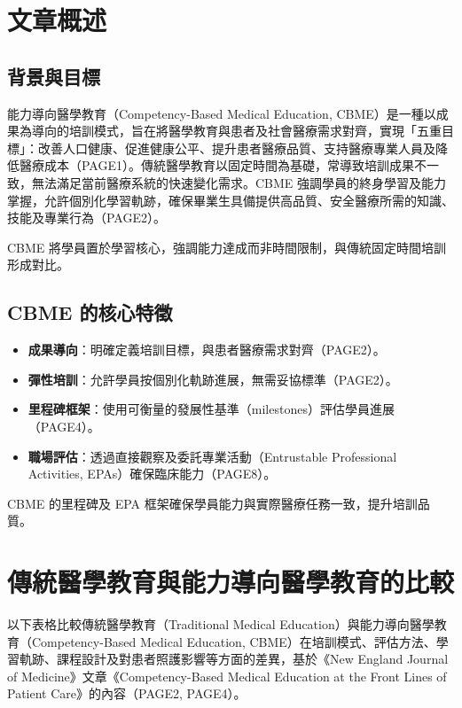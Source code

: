 \documentclass[12pt,a4paper]{article}
\newcommand{\note}[1]{
    \par
    \noindent
    \begin{tcolorbox}[
        colback=emergency_blue!5!white,
        colframe=emergency_blue,
        title=\textbf{重點提醒},
        fonttitle=\bfseries,
        boxrule=0.5pt,
        arc=3pt,
        left=6pt,
        right=6pt,
        top=6pt,
        bottom=6pt
    ]
    #1
    \end{tcolorbox}
}
\begin{document}
\section{文章概述}

\subsection{背景與目標}
能力導向醫學教育（Competency-Based Medical Education, CBME）是一種以成果為導向的培訓模式，旨在將醫學教育與患者及社會醫療需求對齊，實現「五重目標」：改善人口健康、促進健康公平、提升患者醫療品質、支持醫療專業人員及降低醫療成本（PAGE1）。傳統醫學教育以固定時間為基礎，常導致培訓成果不一致，無法滿足當前醫療系統的快速變化需求。CBME 強調學員的終身學習及能力掌握，允許個別化學習軌跡，確保畢業生具備提供高品質、安全醫療所需的知識、技能及專業行為（PAGE2）。

\vspace{0.5cm}
\note{
CBME 將學員置於學習核心，強調能力達成而非時間限制，與傳統固定時間培訓形成對比。
}

\subsection{CBME 的核心特徵}
\begin{itemize}[nosep]
    \item \textbf{成果導向}：明確定義培訓目標，與患者醫療需求對齊（PAGE2）。
    \item \textbf{彈性培訓}：允許學員按個別化軌跡進展，無需妥協標準（PAGE2）。
    \item \textbf{里程碑框架}：使用可衡量的發展性基準（milestones）評估學員進展（PAGE4）。
    \item \textbf{職場評估}：透過直接觀察及委託專業活動（Entrustable Professional Activities, EPAs）確保臨床能力（PAGE8）。
\end{itemize}

\vspace{0.5cm}
\note{
CBME 的里程碑及 EPA 框架確保學員能力與實際醫療任務一致，提升培訓品質。
}
\section{傳統醫學教育與能力導向醫學教育的比較}

以下表格比較傳統醫學教育（Traditional Medical Education）與能力導向醫學教育（Competency-Based Medical Education, CBME）在培訓模式、評估方法、學習軌跡、課程設計及對患者照護影響等方面的差異，基於《New England Journal of Medicine》文章《Competency-Based Medical Education at the Front Lines of Patient Care》的內容（PAGE2, PAGE4）。
\end{document}

